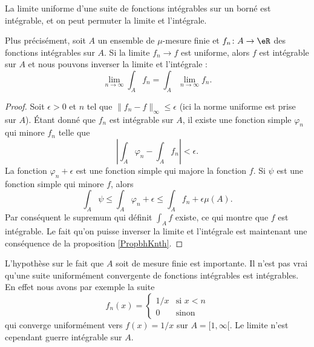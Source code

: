 \begin{theorem}			\label{ThoUnifCvIntRiem}
    La limite uniforme d'une suite de fonctions intégrables sur un borné est intégrable, et on peut permuter la limite et l'intégrale. 
    
    Plus précisément, soit \( A\) un ensemble de \( \mu\)-mesure finie et \( f_n\colon A\to \eR\) des fonctions intégrables sur \( A\). Si la limite \( f_n\to f\) est uniforme, alors \( f\) est intégrable sur \( A\) et nous pouvons inverser la limite et l'intégrale :
    \begin{equation}
        \lim_{n\to \infty} \int_A f_n=\int_A\lim_{n\to \infty} f_n.
    \end{equation}
\end{theorem}

\begin{proof}
    Soit \( \epsilon>0\) et \( n\) tel que \( \| f_n-f \|_{\infty}\leq \epsilon\) (ici la norme uniforme est prise sur \( A\)). Étant donné que \( f_n\) est intégrable sur \( A\), il existe une fonction simple \( \varphi_n\) qui minore \( f_n\) telle que
    \begin{equation}
        \left| \int_{A}\varphi_n-\int_A f_n \right| <\epsilon.
    \end{equation}
    La fonction \( \varphi_n+\epsilon\) est une fonction simple qui majore la fonction \( f\). Si \( \psi\) est une fonction simple qui minore \( f\), alors
    \begin{equation}
        \int_A\psi\leq\int_A\varphi_n+\epsilon\leq\int_A f_n+\epsilon\mu(A).
    \end{equation}
    Par conséquent le supremum qui définit \( \int_A f\) existe, ce qui montre que \( f\) est intégrable. Le fait qu'on puisse inverser la limite et l'intégrale est maintenant une conséquence de la proposition \ref{PropbhKnth}.
\end{proof}

\begin{remark}
    L'hypothèse sur le fait que \( A\) soit de mesure finie est importante. Il n'est pas vrai qu'une suite uniformément convergente de fonctions intégrables est intégrables. En effet nous avons par exemple la suite
    \begin{equation}
        f_n(x)=\begin{cases}
            1/x    &   \text{si } x<n\\
            0    &    \text{sinon}
        \end{cases}
    \end{equation}
    qui converge uniformément vers \( f(x)=1/x\) sur \( A=\mathopen[ 1 , \infty [\). Le limite n'est cependant guerre intégrable sur \( A\).
\end{remark}

